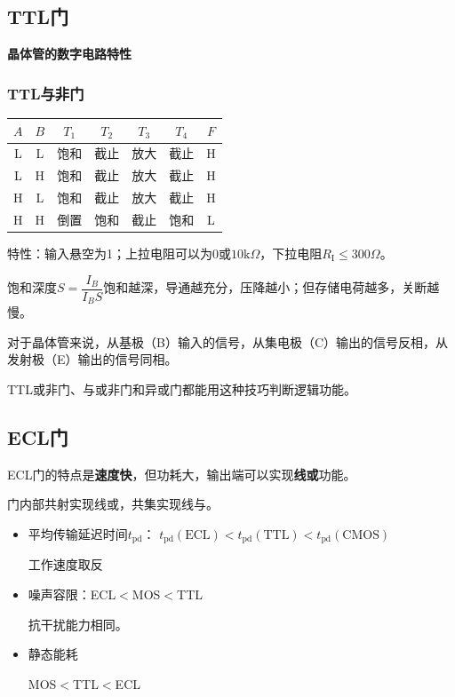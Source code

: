 \documentclass[UTF8,fontset=fandol,zihao=5]{ctexart}
\begin{document}
\subsection{TTL门}

\textbf{晶体管的数字电路特性}

\subsubsection{TTL与非门}

\begin{table}[htbp]
  \centering
  \begin{tabular}{ccccccc}
    \toprule
    $A$ & $B$ & $T_1$ & $T_2$ & $T_3$ & $T_4$ & $F$ \\
    \midrule
    L & L & 饱和 & 截止 & 放大 & 截止 & H \\
    L & H & 饱和 & 截止 & 放大 & 截止 & H \\
    H & L & 饱和 & 截止 & 放大 & 截止 & H \\
    H & H & 倒置 & 饱和 & 截止 & 饱和 & L \\
    \bottomrule
  \end{tabular}
\end{table}

特性：输入悬空为1；上拉电阻可以为0或$10\text{k}\Omega$，下拉电阻$R_{\mathrm{I}}\leq300\Omega$。

饱和深度$S=\dfrac{I_B}{I_BS}$饱和越深，导通越充分，压降越小；但存储电荷越多，关断越慢。

\begin{methodbox}[【技巧】快速判断TTL门电路的逻辑功能]
  对于晶体管来说，从基极（B）输入的信号，从集电极（C）输出的信号反相，从发射极（E）输出的信号同相。
\end{methodbox}

TTL或非门、与或非门和异或门都能用这种技巧判断逻辑功能。

\subsection{ECL门}

ECL门的特点是\textbf{速度快}，但功耗大，输出端可以实现\textbf{线或}功能。

门内部共射实现线或，共集实现线与。

\begin{methodbox}[三种门的性质比较]
  \begin{itemize}
    \item 平均传输延迟时间$t_{\text{pd}}$：
    $t_{\text{pd}}(\text{ECL})<t_{\text{pd}}(\text{TTL})<t_{\text{pd}}(\text{CMOS})$

    工作速度取反
    \item 噪声容限：ECL$<$MOS$<$TTL

    抗干扰能力相同。
    \item 静态能耗
    
    MOS$<$TTL$<$ECL
  \end{itemize}
\end{methodbox}
\end{document}
